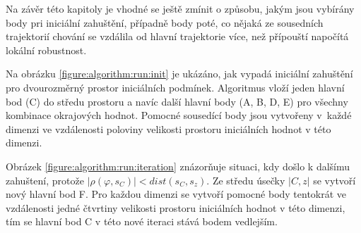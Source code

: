 Na závěr této kapitoly je vhodné se ještě zmínit o způsobu, jakým jsou vybírány
body pri iniciální zahuštění, případně body poté, co nějaká ze sousedních trajektorií
chování se vzdálila od hlavní trajektorie více, než přípouští napočítá lokální 
robustnost.

Na obrázku \ref{figure:algorithm:run:init} je ukázáno, jak vypadá iniciální zahuštění
pro dvourozměrný prostor iniciálních podmínek. Algoritmus vloží jeden hlavní bod (C) do středu prostoru
a navíc další hlavní body (A, B, D, E) pro všechny kombinace okrajových hodnot. Pomocné sousedící body
jsou vytvořeny v~každé dimenzi ve vzdálenosti poloviny velikosti prostoru iniciálních hodnot
v této dimenzi.

Obrázek \ref{figure:algorithm:run:iteration} znázorňuje situaci, kdy došlo k dalšímu zahuštení,
pro\-tože $\big|\rho(\varphi, s_C)\big| < dist(s_C, s_z)$. Ze středu úsečky $|C,z|$ se vytvoří
nový hlavní bod F. Pro každou dimenzi se vytvoří pomocné body tentokrát ve vzdá\-le\-nosti jedné čtvrtiny
velikosti prostoru iniciálních hodnot v této dimenzi, tím se hlavní bod C v této nové iteraci stává bodem
vedlejším.
